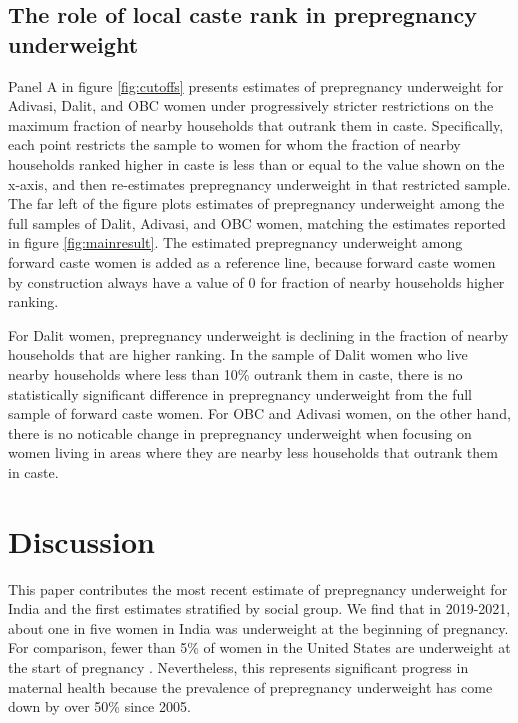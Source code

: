\documentclass[12pt]{article}
\begin{document}
\subsection{The role of local caste rank in prepregnancy underweight}
  
Panel A in figure \ref{fig:cutoffs} presents estimates of prepregnancy underweight for Adivasi, Dalit, and OBC women under progressively stricter restrictions on the maximum fraction of nearby households that outrank them in caste. Specifically, each point restricts the sample to women for whom the fraction of nearby households ranked higher in caste is less than or equal to the value shown on the x-axis, and then re-estimates prepregnancy underweight in that restricted sample. The far left of the figure plots estimates of prepregnancy underweight among the full samples of Dalit, Adivasi, and OBC women, matching the estimates reported in figure \ref{fig:mainresult}. The estimated prepregnancy underweight among forward caste women is added as a reference line, because forward caste women by construction always have a value of 0 for fraction of nearby households higher ranking.

For Dalit women, prepregnancy underweight is declining in the fraction of nearby households that are higher ranking. In the sample of Dalit women who live nearby households where less than 10\% outrank them in caste, there is no statistically significant difference in prepregnancy underweight from the full sample of forward caste women. For OBC and Adivasi women, on the other hand, there is no noticable change in prepregnancy underweight when focusing on women living in areas where they are nearby less households that outrank them in caste.



\section{Discussion}

This paper contributes the most recent estimate of prepregnancy underweight for India and the first estimates stratified by social group. We find that in 2019-2021, about one in five women in India was underweight at the beginning of pregnancy. For comparison, fewer than 5\% of women in the United States are underweight at the start of pregnancy \citep{zong2022maternal}.  Nevertheless, this represents significant progress in maternal health because the prevalence of prepregnancy underweight has come down by over 50\% since 2005.  
\end{document}
